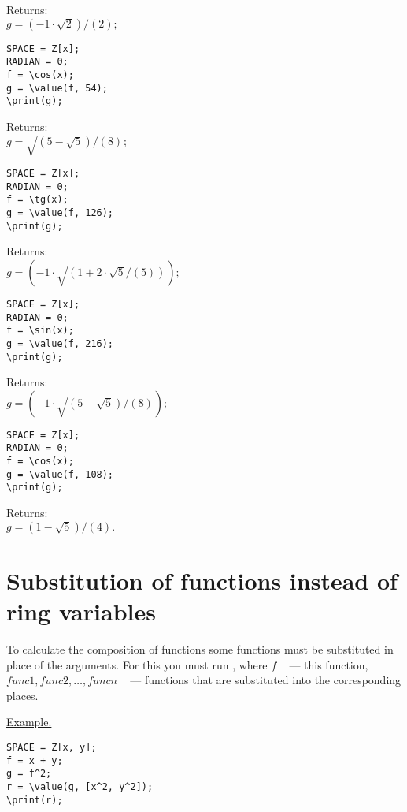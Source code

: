 Returns:\\
$g = (-1\cdot \sqrt{2})/(2);$

\begin{verbatim}
SPACE = Z[x];
RADIAN = 0;
f = \cos(x);
g = \value(f, 54);
\print(g);
\end{verbatim}

Returns:\\
$g = \sqrt{(5-\sqrt{5})/(8)};$

\begin{verbatim}
SPACE = Z[x];
RADIAN = 0;
f = \tg(x);
g = \value(f, 126);
\print(g);
\end{verbatim}
\vspace*{-2mm}

Returns: \\
$g = (-1\cdot \sqrt{(1+2\cdot \sqrt{5}/(5))});$

\begin{verbatim}
SPACE = Z[x];
RADIAN = 0;
f = \sin(x);
g = \value(f, 216);
\print(g);
\end{verbatim}
\vspace*{-2mm}

Returns: \\
$g = (-1\cdot \sqrt{(5-\sqrt{5})/(8)});$

\begin{verbatim}
SPACE = Z[x];
RADIAN = 0;
f = \cos(x);
g = \value(f, 108);
\print(g);
\end{verbatim}
\vspace*{-2mm}

Returns:\\
$g = (1-\sqrt{5})/(4). $

\section{Substitution of functions instead of ring variables} 
To calculate the composition of functions some functions must be substituted in place of the arguments. For this
you must run 
   , 
where $ f $ ~ --- this function,
$ func1, func2, \ldots, funcn $ ~ --- functions that are substituted into the corresponding places.

\smallskip

\underline{Example. }

\vspace*{-2mm}
\begin{verbatim}
SPACE = Z[x, y];
f = x + y;
g = f^2;
r = \value(g, [x^2, y^2]);
\print(r);
\end{verbatim}
\vspace*{-2mm}

